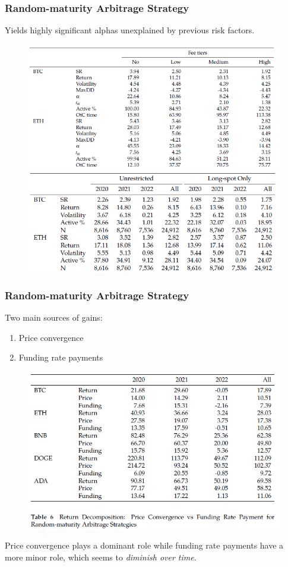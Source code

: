 \documentclass{beamer}
\begin{document}
\begin{frame}
\frametitle{Random-maturity Arbitrage Strategy}
Yields highly significant alphas unexplained by previous risk factors.
\begin{figure}
    \includegraphics[width=0.65\linewidth]{figs/Table4-1.png}
    \includegraphics[width=0.65\linewidth]{figs/Table5-1.png}
\end{figure}
\end{frame}

\begin{frame}
\frametitle{Random-maturity Arbitrage Strategy}
Two main sources of gains: 
\begin{enumerate}
    \item Price convergence
    \item Funding rate payments
\end{enumerate}
\begin{figure}
    \includegraphics[width=0.65\linewidth]{figs/Table6.png}
\end{figure}
Price convergence plays a dominant role while funding rate payments have a more minor role, which seems to \textit{diminish over time}.
\end{frame}
\end{document}
